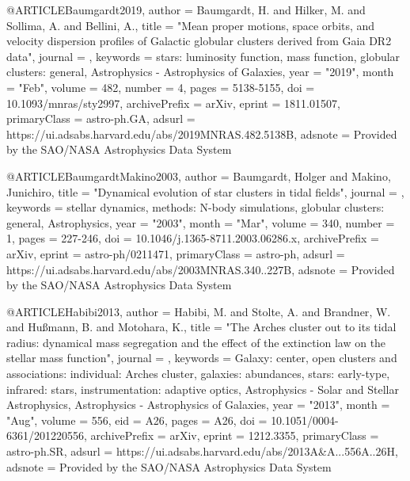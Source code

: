 \documentclass[twocolumn,tighten]{aastex63}
\begin{document}



@ARTICLE{Baumgardt2019,
       author = {{Baumgardt}, H. and {Hilker}, M. and {Sollima}, A. and {Bellini}, A.},
        title = "{Mean proper motions, space orbits, and velocity dispersion profiles of Galactic globular clusters derived from Gaia DR2 data}",
      journal = {\mnras},
     keywords = {stars: luminosity function, mass function, globular clusters: general, Astrophysics - Astrophysics of Galaxies},
         year = "2019",
        month = "Feb",
       volume = {482},
       number = {4},
        pages = {5138-5155},
          doi = {10.1093/mnras/sty2997},
archivePrefix = {arXiv},
       eprint = {1811.01507},
 primaryClass = {astro-ph.GA},
       adsurl = {https://ui.adsabs.harvard.edu/abs/2019MNRAS.482.5138B},
      adsnote = {Provided by the SAO/NASA Astrophysics Data System}
}

@ARTICLE{BaumgardtMakino2003,
       author = {{Baumgardt}, Holger and {Makino}, Junichiro},
        title = "{Dynamical evolution of star clusters in tidal fields}",
      journal = {\mnras},
     keywords = {stellar dynamics, methods: N-body simulations, globular clusters: general, Astrophysics},
         year = "2003",
        month = "Mar",
       volume = {340},
       number = {1},
        pages = {227-246},
          doi = {10.1046/j.1365-8711.2003.06286.x},
archivePrefix = {arXiv},
       eprint = {astro-ph/0211471},
 primaryClass = {astro-ph},
       adsurl = {https://ui.adsabs.harvard.edu/abs/2003MNRAS.340..227B},
      adsnote = {Provided by the SAO/NASA Astrophysics Data System}
}


@ARTICLE{Habibi2013,
       author = {{Habibi}, M. and {Stolte}, A. and {Brandner}, W. and {Hu{\ss}mann}, B. and
         {Motohara}, K.},
        title = "{The Arches cluster out to its tidal radius: dynamical mass segregation and the effect of the extinction law on the stellar mass function}",
      journal = {\aap},
     keywords = {Galaxy: center, open clusters and associations: individual: Arches cluster, galaxies: abundances, stars: early-type, infrared: stars, instrumentation: adaptive optics, Astrophysics - Solar and Stellar Astrophysics, Astrophysics - Astrophysics of Galaxies},
         year = "2013",
        month = "Aug",
       volume = {556},
          eid = {A26},
        pages = {A26},
          doi = {10.1051/0004-6361/201220556},
archivePrefix = {arXiv},
       eprint = {1212.3355},
 primaryClass = {astro-ph.SR},
       adsurl = {https://ui.adsabs.harvard.edu/abs/2013A&A...556A..26H},
      adsnote = {Provided by the SAO/NASA Astrophysics Data System}
}
\end{document}
